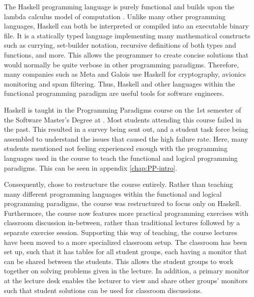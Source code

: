 The Haskell programming language is purely functional\cite{Haskell_landing} and builds upon the lambda calculus model of computation \cite{Haskell_book}.
Unlike many other programming languages, Haskell can both be interpreted or compiled into an executable binary file.
It is a statically typed language implementing many mathematical constructs such as currying, set-builder notation, recursive definitions of both types and functions, and more.
This allows the programmer to create concise solutions that would normally be quite verbose in other programming paradigms.
Therefore, many companies such as Meta and Galois use Haskell for cryptography, avionics monitoring and spam filtering\cite{Haskell_companies}.
Thus, Haskell and other languages within the functional programming paradigm are useful tools for software engineers.


Haskell is taught in the Programming Paradigms course on the 1st semester of the Software Master's Degree at \aau{}.
Most students attending this course failed in the past.
This resulted in a survey being sent out, and a student task force being assembled to understand the issues that caused the high failure rate.
Here, many students mentioned not feeling experienced enough with the programming languages used in the course to teach the functional and logical programming paradigms. This can be seen in appendix \ref{chap:PP-intro}.


Consequently, \aau{} chose to restructure the course entirely.
Rather than teaching many different programming languages within the functional and logical programming paradigms, the course was restructured to focus only on Haskell.
Furthermore, the course now features more practical programming exercises with classroom discussion in-between, rather than traditional lectures followed by a separate exercise session.
Supporting this way of teaching, the course lectures have been moved to a more specialized classroom setup. The classroom has been set up, such that it has tables for all student groups, each having a monitor that can be shared between the students. This allows the student groups to work together on solving problems given in the lecture.
In addition, a primary monitor at the lecture desk enables the lecturer to view and share other groups' monitors such that student solutions can be used for classroom discussions.


